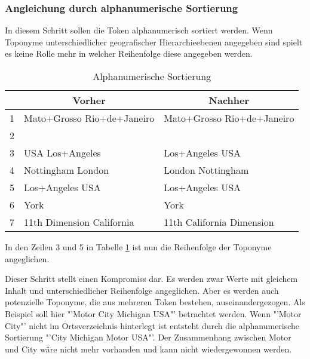 			\subsubsection{Angleichung durch alphanumerische Sortierung}

				In diesem Schritt sollen die Token alphanumerisch sortiert werden. 
				Wenn Toponyme unterschiedlicher geografischer Hierarchieebenen angegeben sind spielt es keine Rolle mehr in welcher Reihenfolge diese angegeben werden.

				\begin{table}[h]
				\centering
				\caption{Alphanumerische Sortierung}
				\label{tab:VorverarbeitungAlpha}
				\begin{tabular}{|l|l|l|}
				\hline
				  & \multicolumn{1}{c|}{\textbf{Vorher}} & \multicolumn{1}{c|}{\textbf{Nachher}} \\ \hline
				1 & Mato+Grosso Rio+de+Janeiro           & Mato+Grosso Rio+de+Janeiro            \\ \hline
				2 &                                      &                                       \\ \hline
				3 & USA Los+Angeles                      & Los+Angeles USA                       \\ \hline
				4 & Nottingham London                    & London Nottingham                     \\ \hline
				5 & Los+Angeles USA                      & Los+Angeles USA                       \\ \hline
				6 & York                                 & York                                  \\ \hline
				7 & 11th Dimension California            & 11th California Dimension             \\ \hline
				\end{tabular}
				\end{table}

				In den Zeilen 3 und 5 in Tabelle \ref{tab:VorverarbeitungAlpha} ist nun die Reihenfolge der Toponyme angeglichen. 
				
				Dieser Schritt stellt einen Kompromiss dar.
				Es werden zwar Werte mit gleichem Inhalt und unterschiedlicher Reihenfolge angeglichen.
				Aber es werden auch potenzielle Toponyme, die aus mehreren Token bestehen, auseinandergezogen.
				Als Beispiel soll hier "'Motor City Michigan USA"' betrachtet werden.
				Wenn "'Motor City"' nicht im Ortsverzeichnis hinterlegt ist entsteht durch die alphanumerische Sortierung "'City Michigan Motor USA"'.
				Der Zusammenhang zwischen Motor und City wäre nicht mehr vorhanden und kann nicht wiedergewonnen werden.

